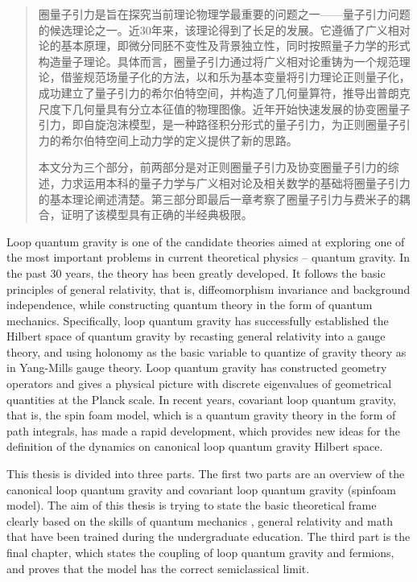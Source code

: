 

\begin{abstract}
  圈量子引力是旨在探究当前理论物理学最重要的问题之一——量子引力问题的候选理论之一。近30年来，该理论得到了长足的发展。它遵循了广义相对论的基本原理，即微分同胚不变性及背景独立性，同时按照量子力学的形式构造量子理论。具体而言，圈量子引力通过将广义相对论重铸为一个规范理论，借鉴规范场量子化的方法，以和乐为基本变量将引力理论正则量子化，成功建立了量子引力的希尔伯特空间，并构造了几何量算符，推导出普朗克尺度下几何量具有分立本征值的物理图像。近年开始快速发展的协变圈量子引力，即自旋泡沫模型，是一种路径积分形式的量子引力，为正则圈量子引力的希尔伯特空间上动力学的定义提供了新的思路。
  
  本文分为三个部分，前两部分是对正则圈量子引力及协变圈量子引力的综述，力求运用本科的量子力学与广义相对论及相关数学的基础将圈量子引力的基本理论阐述清楚。第三部分即最后一章考察了圈量子引力与费米子的耦合，证明了该模型具有正确的半经典极限。
\end{abstract}

\begin{enabstract}
  Loop quantum gravity is one of the candidate theories aimed at exploring one of the most important problems in current theoretical physics -- quantum gravity. In the past 30 years, the theory has been greatly developed. It follows the basic principles of general relativity, that is, diffeomorphism invariance and background independence, while constructing quantum theory in the form of quantum mechanics. Specifically, loop quantum gravity has successfully established the Hilbert space of quantum gravity by recasting general relativity into a gauge theory, and using holonomy as the basic variable to quantize of gravity theory as in Yang-Mills gauge theory. Loop quantum gravity has constructed geometry operators and gives a physical picture with discrete eigenvalues of geometrical quantities at the Planck scale. In recent years, covariant loop quantum gravity, that is, the spin foam model, which is a quantum gravity theory in the form of path integrals, has made a rapid development, which provides new ideas for the definition of the dynamics on canonical loop quantum gravity Hilbert space.
  
  
  This thesis is divided into three parts. The first two parts are an overview of the canonical loop quantum gravity and covariant loop quantum gravity (spinfoam model). The aim of this thesis is trying to state the basic theoretical frame clearly based on the skills of quantum mechanics , general relativity and math that have been trained during the undergraduate education. The third part is the final chapter, which states the coupling of loop quantum gravity and fermions, and proves that the model has the correct semiclassical limit.

\end{enabstract}
